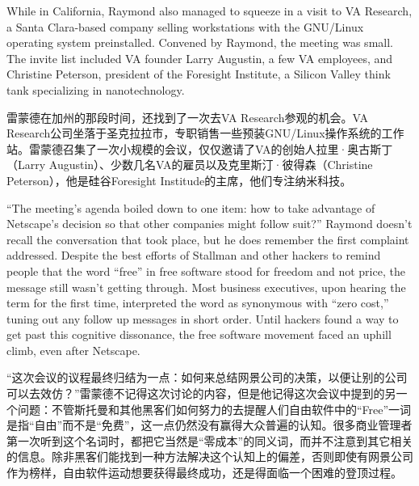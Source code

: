 \ifdefined\eng
While in California, Raymond also managed to squeeze in a visit to VA Research, a Santa Clara-based company selling workstations with the GNU/Linux operating system preinstalled. Convened by Raymond, the meeting was small. The invite list included VA founder Larry Augustin, a few VA employees, and Christine Peterson, president of the Foresight Institute, a Silicon Valley think tank specializing in nanotechnology.
\fi

\ifdefined\chs
雷蒙德在加州的那段时间，还找到了一次去VA Research参观的机会。VA Research公司坐落于圣克拉拉市，专职销售一些预装GNU/Linux操作系统的工作站。雷蒙德召集了一次小规模的会议，仅仅邀请了VA的创始人拉里·奥古斯丁（Larry Augustin）、少数几名VA的雇员以及克里斯汀·彼得森（Christine Peterson），他是硅谷Foresight Institude的主席，他们专注纳米科技。
\fi

\ifdefined\eng
``The meeting's agenda boiled down to one item: how to take advantage of Netscape's decision so that other companies might follow suit?'' Raymond doesn't recall the conversation that took place, but he does remember the first complaint addressed. Despite the best efforts of Stallman and other hackers to remind people that the word ``free'' in free software stood for freedom and not price, the message still wasn't getting through. Most business executives, upon hearing the term for the first time, interpreted the word as synonymous with ``zero cost,'' tuning out any follow up messages in short order. Until hackers found a way to get past this cognitive dissonance, the free software movement faced an uphill climb, even after Netscape.
\fi

\ifdefined\chs
``这次会议的议程最终归结为一点：如何来总结网景公司的决策，以便让别的公司可以去效仿？''雷蒙德不记得这次讨论的内容，但是他记得这次会议中提到的另一个问题：不管斯托曼和其他黑客们如何努力的去提醒人们自由软件中的``Free''一词是指``自由''而不是``免费''，这一点仍然没有赢得大众普遍的认知。很多商业管理者第一次听到这个名词时，都把它当然是``零成本''的同义词，而并不注意到其它相关的信息。除非黑客们能找到一种方法解决这个认知上的偏差，否则即使有网景公司作为榜样，自由软件运动想要获得最终成功，还是得面临一个困难的登顶过程。
\fi


